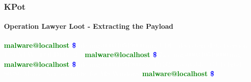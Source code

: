 \documentclass[aspectratio=169]{beamer}
\begin{document}
{
\begin{frame}
  \frametitle{KPot}
  \framesubtitle{Operation Lawyer Loot - Extracting the Payload}
  \begin{center}
    \begin{tcolorbox}[title=terminal,colback=black]
      \begin{minipage}{0.8\textwidth}
        \textbf{\textcolor{green}{malware@localhost \textcolor{blue}{\~ \$}}}
        \textcolor{white}{ file img-000310519000.img}
        \newline
        \textcolor{white}{UDF filesystem data (version 1.5) NEW\_FOLDER\_2\_}
        \newline
        \textbf{\textcolor{green}{malware@localhost \textcolor{blue}{\~ \$}}}
        \textcolor{white}{ 7z e img-000310519000.img}
        \newline
        \textbf{\textcolor{green}{malware@localhost \textcolor{blue}{\~ \$}}}
        \textcolor{white}{ file img-00031051900.exe}
        \newline
        \textcolor{white}{PE32 executable (GUI) Intel 80386 Mono/.Net assembly, for MS Windows}
        \newline
        \textbf{\textcolor{green}{malware@localhost \textcolor{blue}{\~ \$}}}
      \end{minipage}
    \end{tcolorbox}
  \end{center}
\end{frame}
}
\end{document}
